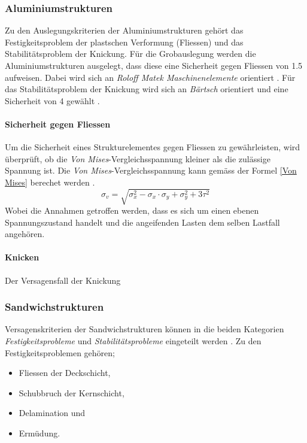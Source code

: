   \subsubsection{Aluminiumstrukturen}
  Zu den Auslegungskriterien der Aluminiumstrukturen gehört das Festigkeitsproblem der plastschen Verformung (Fliessen) und das Stabilitätsproblem der Knickung. Für die Grobauslegung werden die Aluminiumstrukturen ausgelegt, dass diese eine Sicherheit gegen Fliessen von 1.5 aufweisen. Dabei wird sich an \emph{Roloff Matek Maschinenelemente} orientiert \cite{Roloff}. Für das Stabilitätsproblem der Knickung wird sich an \emph{Bärtsch} orientiert und eine Sicherheit von 4 gewählt \cite{Baertsch}.

  \paragraph{Sicherheit gegen Fliessen}
  Um die Sicherheit eines Strukturelementes gegen Fliessen zu gewährleisten, wird überprüft, ob die \emph{Von Mises}-Vergleichsspannung kleiner als die zulässige Spannung ist. Die \emph{Von Mises}-Vergleichsspannung kann gemäss der Formel \ref{Von Mises} berechet werden \cite{Baertsch}.
  \begin{equation}
    \label{Von Mises}
    \sigma_v = \sqrt{\sigma_x^{2}-\sigma_x \cdot \sigma_y + \sigma_y^2 + 3\tau^2}
  \end{equation}
  Wobei die Annahmen getroffen werden, dass es sich um einen ebenen Spannungszustand handelt und die angeifenden Lasten dem selben Lastfall angehören.

  \paragraph{Knicken}
  Der Versagensfall der Knickung

  \subsubsection{Sandwichstrukturen}
  Versagenskriterien der Sandwichstrukturen können in die beiden Kategorien \emph{Festigkeitsprobleme} und \emph{Stabilitätsprobleme} eingeteilt werden \cite{ETH}. Zu den Festigkeitsproblemen gehören;
  \begin{itemize}
    \item Fliessen der Deckschicht,
    \item Schubbruch der Kernschicht,
    \item Delamination und
    \item Ermüdung.
  \end{itemize}

